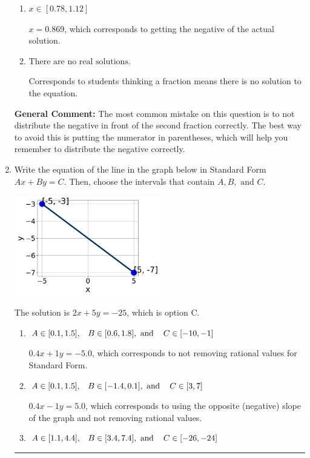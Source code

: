 \documentclass{extbook}[14pt]
\newcommand{\litem}[1]{\item #1

\rule{\textwidth}{0.4pt}}
\begin{document}
\begin{enumerate}
{\begin{enumerate}[label=\Alph*.]
$x = -2.304$, which corresponds to not distributing the negative in front of the first parentheses correctly.
\item \( x \in [0.78, 1.12] \)

$x = 0.869$, which corresponds to getting the negative of the actual solution.
\item \( \text{There are no real solutions.} \)

Corresponds to students thinking a fraction means there is no solution to the equation.
\end{enumerate}

\textbf{General Comment:} The most common mistake on this question is to not distribute the negative in front of the second fraction correctly. The best way to avoid this is putting the numerator in parentheses, which will help you remember to distribute the negative correctly.
}
\litem{
Write the equation of the line in the graph below in Standard Form $Ax+By=C$. Then, choose the intervals that contain $A, B, \text{ and } C$.

\begin{center}
    \includegraphics[width=0.5\textwidth]{../Figures/linearGraphToStandardB.png}
\end{center}


The solution is \( 2x + 5y = -25 \), which is option C.\begin{enumerate}[label=\Alph*.]
\item \( A \in [0.1, 1.5], \hspace{3mm} B \in [0.6, 1.8], \text{ and } \hspace{3mm} C \in [-10, -1] \)

 $0.4x + 1y = -5.0$, which corresponds to not removing rational values for Standard Form.
\item \( A \in [0.1, 1.5], \hspace{3mm} B \in [-1.4, 0.1], \text{ and } \hspace{3mm} C \in [3, 7] \)

 $0.4x - 1y = 5.0$, which corresponds to using the opposite (negative) slope of the graph and not removing rational values.
\item \( A \in [1.1, 4.4], \hspace{3mm} B \in [3.4, 7.4], \text{ and } \hspace{3mm} C \in [-26, -24] \)


\end{enumerate}}
\end{enumerate}
\end{document}
